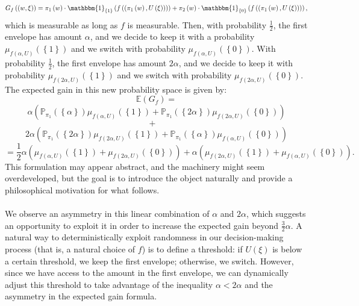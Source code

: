 \begin{solution}
    \[
        G_f\left(\left(w,\xi\right)\right)=\pi_1\left(w\right)\cdot\mathbbm{1}_{\left\{1\right\}}\left(f\left(\left(\pi_{1}\left(w\right),U\left(\xi\right)\right)\right)\right)+\pi_2\left(w\right)\cdot\mathbbm{1}_{\left\{0\right\}}\left(f\left(\left(\pi_{1}\left(w\right),U\left(\xi\right)\right)\right)\right),
    \]
    which is measurable as long as \( f \) is measurable. Then, with probability \( \frac{1}{2} \), the first envelope has amount \( \alpha \), and we decide to keep it with a probability \( \mu_{f\left(\alpha, U\right)}\left(\left\{1\right\}\right) \) and we switch with probability \( \mu_{f\left(\alpha, U\right)}\left(\left\{0\right\}\right) \). With probability \( \frac{1}{2} \), the first envelope has amount \( 2\alpha \), and we decide to keep it with probability \( \mu_{f\left(2\alpha, U\right)}\left(\left\{1\right\}\right) \) and we switch with probability \( \mu_{f\left(2\alpha, U\right)}\left(\left\{0\right\}\right) \). The expected gain in this new probability space is given by:
    \[
        \mathbb{E}\left(G_f\right) =
    \]
    \[
        \alpha\left(\mathbb{P}_{\pi_1}\left(\left\{\alpha\right\}\right)\mu_{f\left(\alpha, U\right)}\left(\left\{1\right\}\right) + \mathbb{P}_{\pi_1}\left(\left\{2\alpha\right\}\right)\mu_{f\left(2\alpha, U\right)}\left(\left\{0\right\}\right)\right)
    \]
    \[
        + \quad
    \]
    \[
        2\alpha\left(\mathbb{P}_{\pi_1}\left(\left\{2\alpha\right\}\right)\mu_{f\left(2\alpha, U\right)}\left(\left\{1\right\}\right) + \mathbb{P}_{\pi_1}\left(\left\{\alpha\right\}\right)\mu_{f\left(\alpha, U\right)}\left(\left\{0\right\}\right)\right)
    \]
    \[
        = \frac{1}{2}\alpha\left(\mu_{f\left(\alpha, U\right)}\left(\left\{1\right\}\right) + \mu_{f\left(2\alpha, U\right)}\left(\left\{0\right\}\right)\right) + \alpha\left(\mu_{f\left(2\alpha, U\right)}\left(\left\{1\right\}\right) + \mu_{f\left(\alpha, U\right)}\left(\left\{0\right\}\right)\right).
    \]
    This formulation may appear abstract, and the machinery might seem overdeveloped, but the goal is to introduce the object naturally and provide a philosophical motivation for what follows.
    \\\\
    We observe an asymmetry in this linear combination of \( \alpha \) and \( 2\alpha \), which suggests an opportunity to exploit it in order to increase the expected gain beyond \( \frac{3}{2}\alpha \). A natural way to deterministically exploit randomness in our decision-making process (that is, a natural choice of \( f \)) is to define a threshold: if \( U\left(\xi\right) \) is below a certain threshold, we keep the first envelope; otherwise, we switch. However, since we have access to the amount in the first envelope, we can dynamically adjust this threshold to take advantage of the inequality \( \alpha < 2\alpha \) and the asymmetry in the expected gain formula.

\end{solution}
